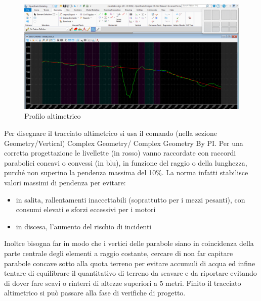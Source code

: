 \begin{figure}[H]
    \includegraphics[width=\textwidth]{Figures/Profilo altimetrico.png}
      \caption{Profilo altimetrico}
      \label{Profiloaltimetrico}
\end{figure}

Per disegnare il tracciato altimetrico si usa il comando (nella sezione Geometry/Vertical) Complex Geometry/ Complex Geometry By PI. Per una corretta progettazione le livellette (in rosso) vanno raccordate con raccordi parabolici concavi o convessi (in blu), in funzione del raggio o della lunghezza, purché non superino la pendenza massima del 10\%. La norma infatti stabilisce valori massimi di pendenza per evitare:

\begin{itemize}
    \item[\bullet] in salita, rallentamenti inaccettabili (soprattutto per i mezzi pesanti), con
    consumi elevati e sforzi eccessivi per i motori
    \item[\bullet] in discesa, l'aumento del rischio di incidenti
\end{itemize}

Inoltre bisogna far in modo che i vertici delle parabole siano in coincidenza della parte centrale degli elementi a raggio costante, cercare di non far capitare parabole concave sotto alla quota terreno per evitare accumuli di acqua ed infine tentare di equilibrare il quantitativo di terreno da scavare e da riportare evitando di dover fare scavi o rinterri di altezze superiori a 5 metri. Finito il tracciato altimetrico si può passare alla fase di verifiche di progetto.